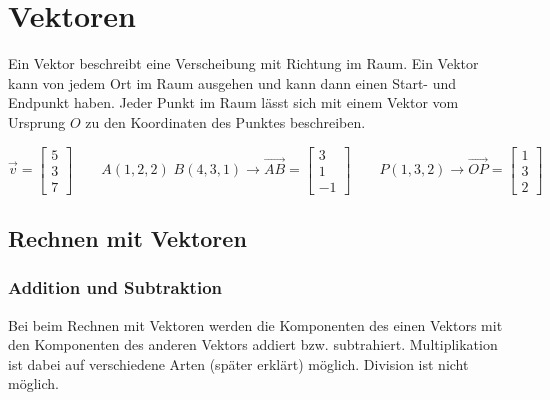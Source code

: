 \section{Vektoren}

Ein Vektor beschreibt eine Verscheibung mit Richtung im Raum.
Ein Vektor kann von jedem Ort im Raum ausgehen und kann dann einen Start- und Endpunkt haben.
Jeder Punkt im Raum lässt sich mit einem Vektor vom Ursprung $O$ zu den
Koordinaten des Punktes beschreiben.

\begin{equation*}
    \overrightarrow{v} = \begin{bmatrix}
        5 \\
        3 \\
        7
    \end{bmatrix}
    \qquad A (1, 2, 2) \; B (4, 3, 1) \rightarrow \overrightarrow{AB} = \begin{bmatrix}
        3 \\
        1 \\
        -1
    \end{bmatrix}
    \qquad P (1, 3, 2) \rightarrow \overrightarrow{OP} = \begin{bmatrix}
        1 \\
        3 \\
        2
    \end{bmatrix}
\end{equation*}

\subsection{Rechnen mit Vektoren}

\subsubsection{Addition und Subtraktion}

Bei beim Rechnen mit Vektoren werden die Komponenten des einen Vektors
mit den Komponenten des anderen Vektors addiert bzw. subtrahiert.
Multiplikation ist dabei auf verschiedene Arten (später erklärt) möglich.
Division ist nicht möglich.

